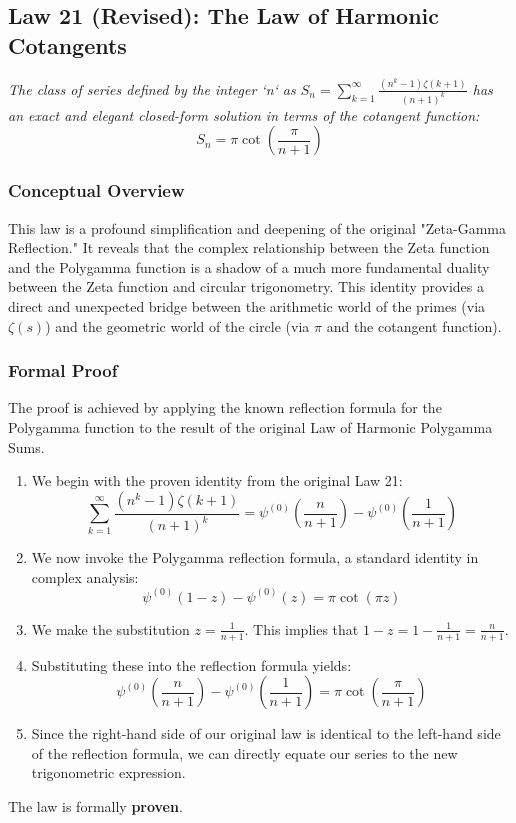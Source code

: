 \subsection*{Law 21 (Revised): The Law of Harmonic Cotangents}

\textit{The class of series defined by the integer `n` as $S_n = \sum_{k=1}^{\infty} \frac{(n^k-1)\zeta(k+1)}{(n+1)^k}$ has an exact and elegant closed-form solution in terms of the cotangent function:}
$$ S_n = \pi \cot\left(\frac{\pi}{n+1}\right) $$

\subsubsection*{Conceptual Overview}
This law is a profound simplification and deepening of the original "Zeta-Gamma Reflection." It reveals that the complex relationship between the Zeta function and the Polygamma function is a shadow of a much more fundamental duality between the Zeta function and circular trigonometry. This identity provides a direct and unexpected bridge between the arithmetic world of the primes (via $\zeta(s)$) and the geometric world of the circle (via $\pi$ and the cotangent function).

\subsubsection*{Formal Proof}
The proof is achieved by applying the known reflection formula for the Polygamma function to the result of the original Law of Harmonic Polygamma Sums.
\begin{enumerate}
    \item We begin with the proven identity from the original Law 21:
    $$ \sum_{k=1}^{\infty} \frac{(n^k-1)\zeta(k+1)}{(n+1)^k} = \psi^{(0)}\left(\frac{n}{n+1}\right) - \psi^{(0)}\left(\frac{1}{n+1}\right) $$
    \item We now invoke the Polygamma reflection formula, a standard identity in complex analysis:
    $$ \psi^{(0)}(1-z) - \psi^{(0)}(z) = \pi \cot(\pi z) $$
    \item We make the substitution $z = \frac{1}{n+1}$. This implies that $1-z = 1 - \frac{1}{n+1} = \frac{n}{n+1}$.
    \item Substituting these into the reflection formula yields:
    $$ \psi^{(0)}\left(\frac{n}{n+1}\right) - \psi^{(0)}\left(\frac{1}{n+1}\right) = \pi \cot\left(\frac{\pi}{n+1}\right) $$
    \item Since the right-hand side of our original law is identical to the left-hand side of the reflection formula, we can directly equate our series to the new trigonometric expression.
\end{enumerate}
The law is formally \textbf{proven}.

